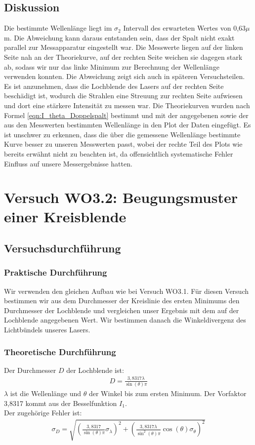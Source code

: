 \documentclass[12pt]{scrartcl}
\begin{document}
\subsection{Diskussion}
Die bestimmte Wellenlänge liegt im $\sigma_2$ Intervall des erwarteten Wertes von 0,63$\mu$m. Die Abweichung kann daraus entstanden sein, dass der Spalt nicht exakt parallel zur Messapparatur eingestellt war.
Die Messwerte liegen auf der linken Seite nah an der Theoriekurve, auf der rechten Seite weichen sie dagegen stark ab, sodass wir nur das linke Minimum zur Berechnung der Wellenlänge verwenden konnten. Die Abweichung zeigt sich auch in späteren Versuchsteilen. Es ist anzunehmen, dass die Lochblende des Lasers auf der rechten Seite beschädigt ist, wodurch die Strahlen eine Streuung zur rechten Seite aufwiesen und dort eine stärkere Intensität zu messen war.
Die Theoriekurven wurden nach Formel \ref{eqn:I_theta_Doppelspalt} bestimmt und mit der angegebenen sowie der aus den Messwerten bestimmten Wellenlänge in den Plot der Daten eingefügt. Es ist unschwer zu erkennen, dass die über die gemessene Wellenlänge bestimmte Kurve besser zu unseren Messwerten passt, wobei der rechte Teil des Plots wie bereits erwähnt nicht zu beachten ist, da offensichtlich  systematische Fehler Einfluss auf unsere Messergebnisse hatten.


\section{Versuch WO3.2: Beugungsmuster einer Kreisblende}
\subsection{Versuchsdurchführung}

\subsubsection{Praktische Durchführung}
Wir verwenden den gleichen Aufbau wie bei Versuch WO3.1. Für diesen Versuch bestimmen wir aus dem Durchmesser der Kreislinie des ersten Minimums den Durchmesser der Lochblende und vergleichen unser Ergebnis mit dem auf der Lochblende angegebenen Wert. Wir bestimmen danach die Winkeldivergenz des Lichtbündels unseres Lasers.
\subsubsection{Theoretische Durchführung}
Der Durchmesser $D$ der Lochblende ist:
\begin{align}
D = \frac{3,8317 \lambda}{\sin(\theta)\pi}
\label{eqn:D}
\end{align}
$\lambda$ ist die Wellenlänge und $\theta$ der Winkel bis zum ersten Minimum. Der Vorfaktor 3,8317 kommt aus der Besselfunktion $I_1$.\\
Der zugehörige Fehler ist:
\begin{align}
\sigma_D = \sqrt{
\left(\frac{3,8317}{\sin(\theta)\pi}\sigma_\lambda \right)^2+
\left(\frac{3,8317\lambda}{\sin^2(\theta)\pi}\cos(\theta)
\sigma_\theta \right)^2}
\label{eqn:D_sigma}
\end{align}
\end{document}
